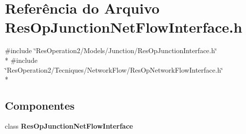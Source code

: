 \section{Referência do Arquivo Res\+Op\+Junction\+Net\+Flow\+Interface.\+h}
\label{_res_op_junction_net_flow_interface_8h}
{\ttfamily \#include \char`\"{}Res\+Operation2/\+Models/\+Junction/\+Res\+Op\+Junction\+Interface.\+h\char`\"{}}\\*
{\ttfamily \#include \char`\"{}Res\+Operation2/\+Tecniques/\+Network\+Flow/\+Res\+Op\+Network\+Flow\+Interface.\+h\char`\"{}}\\*
\subsection*{Componentes}
\begin{DoxyCompactItemize}
\item 
class {\bf Res\+Op\+Junction\+Net\+Flow\+Interface}
\end{DoxyCompactItemize}
